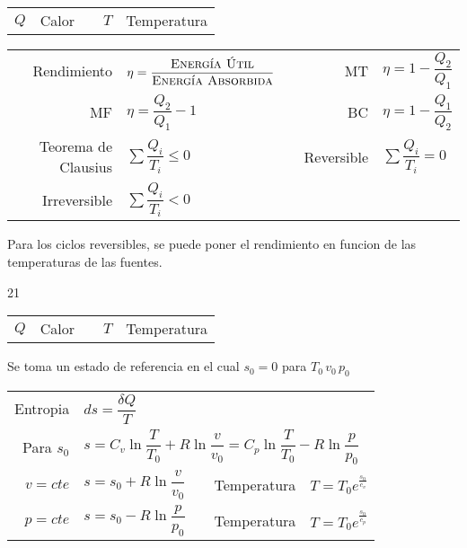 \documentclass[a4paper, 11pt,titlepage]{book}
\begin{document}


\begin{tcolorbox}[title = \large\textbf{Segundo Principio}]
	\begin{tabular}{r l c r l}
		$Q$ & Calor && $T$ & Temperatura 
    \end{tabular}

	\begin{center}
		\begin{tabular}{r | l c r | l}
				\vspace{.3cm}	Rendimiento & $ \eta = \dfrac{\textsc{Energía Útil}}{\textsc{Energía Absorbida}}$ && MT & $\eta = 1 - \dfrac{Q_{2}}{Q_{1}}$ \\
				\vspace{.3cm}   MF & $\eta = \dfrac{Q_{2}}{Q_{1}} - 1$ && BC & $\eta = 1 - \dfrac{Q_{1}}{Q_{2}}$ \\
				\vspace{.3cm}	Teorema de Clausius & $\displaystyle\sum \dfrac{Q_{i}}{T_{i}} \leq 0$ && Reversible & $\displaystyle\sum \dfrac{Q_{i}}{T_{i}} = 0$ \\
                \vspace{.3cm}	Irreversible & $\displaystyle\sum \dfrac{Q_{i}}{T_{i}} < 0$ 
				\end{tabular}
			Para los ciclos reversibles, se puede poner el rendimiento en funcion de las temperaturas de las fuentes.
		\end{center}


21
\end{tcolorbox}

\begin{tcolorbox}[title = \large\textbf{Entropia}]
	\begin{tabular}{r l c r l}
		$Q$ & Calor && $T$& Temperatura \\
		
	\end{tabular}

	Se toma un estado de referencia en el cual $s_{0} = 0$ para $T_{0} \, v_{0} \, p_{0} \, $
	\begin{center}
		\begin{tabular}{r | l c r | l}
			\vspace{.3cm} Entropia & $ds = \dfrac{\delta Q}{T}$ && &\\
			\vspace{.3cm} Para $s_0$ & \multicolumn{4}{l}{$s = C_{v} \ln \dfrac{T}{T_{0}} + R \ln \dfrac{v}{v_{0}} = C_{p} \ln \dfrac{T}{T_{0}} - R \ln \dfrac{p}{p_{0}}$} \\
			\vspace{.3cm} $v = cte$ & $s = s_{0} + R \ln \dfrac{v}{v_{0}} $ && Temperatura & $T = T_{0} e^{\frac{s_{0}}{c_v}}$\\
		   	\vspace{.3cm} $p = cte$ & $s = s_{0} - R \ln \dfrac{p}{p_{0}} $ && Temperatura & $T = T_{0} e^{\frac{s_{0}}{c_p}}$
		\end{tabular}
	\end{center}
\end{tcolorbox}
\end{document}
